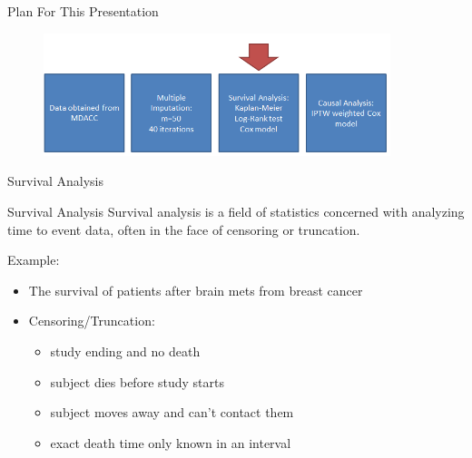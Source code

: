 \begin{frame}{Plan For This Presentation}
  \begin{figure}[h!]
  \centering
    \includegraphics[width=0.9\textwidth]{surv_flow}
\label{fig:surv_flow}
\end{figure} 
\end{frame}

\begin{frame}{Survival Analysis}
\begin{block}{Survival Analysis}
Survival analysis is a field of statistics concerned with analyzing time to 
event data, often in the face of censoring or truncation.
\end{block}
Example:
\begin{itemize}
 \item The survival of patients after brain mets from breast cancer
 \item Censoring/Truncation:
 \begin{itemize}
  \item study ending and no death 
  \item subject dies before study starts
  \item subject moves away and can't contact them 
 \item exact death time only known in an interval
 \end{itemize}

\end{itemize}
\end{frame}

